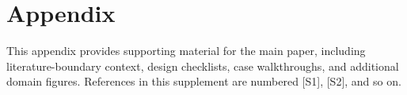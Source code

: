 \documentclass[manuscript]{acmart}
\begin{document}
\renewcommand{\citenumfont}[1]{S#1}
\renewcommand{\bibnumfmt}[1]{[S#1]}

\appendix
\section*{Appendix}

This appendix provides supporting material for the main paper, including literature-boundary context, design checklists, case walkthroughs, and additional domain figures. References in this supplement are numbered [S1], [S2], and so on.








\end{document}
